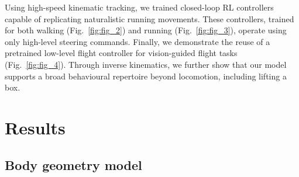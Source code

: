\documentclass[sn-mathphys-num]{sn-jnl}%
\theoremstyle{thmstyleone}%
\theoremstyle{thmstyletwo}%
\theoremstyle{thmstylethree}%
\begin{document}
Using high-speed kinematic tracking\cite{branson2009high,pereira2022sleap}, we trained closed-loop RL controllers capable of replicating naturalistic running movements. 
These controllers, trained for both walking (Fig.~\ref{fig:fig_2}) and running (Fig.~\ref{fig:fig_3}), operate using only high-level steering commands. 
Finally, we demonstrate the reuse of a pretrained low-level flight controller for vision-guided flight tasks (Fig.~\ref{fig:fig_4}). 
Through inverse kinematics, we further show that our model supports a broad behavioural repertoire beyond locomotion, including lifting a box.



%

\section{Results}\label{sec3}

		

\subsection{Body geometry model}
\end{document}
